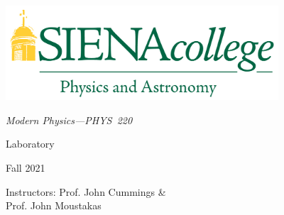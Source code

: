 \includegraphics[width=4in]{siena_phys_astro_print_crop.jpg}

\vspace{10mm}
{\LARGE {\em 
\noindent Modern Physics---PHYS~220

\vspace{5mm}
\noindent Laboratory

\vspace{5mm}
\noindent Fall 2021

\vspace{5mm}
\noindent Instructors: Prof. John Cummings \& \\ Prof. John Moustakas
}}

